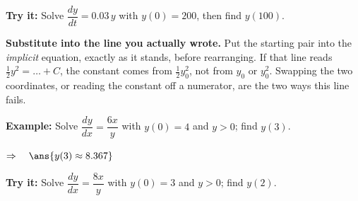 \documentclass[12pt]{article}
\begin{document}
\begin{tryitbox}
\textbf{Try it:} \quad Solve $\dfrac{dy}{dt} = 0.03\,y$ with $y(0) = 200$, then find $y(100)$.\\[2pt]
\end{tryitbox}


\begin{formulabox}
\textbf{Substitute into the line you actually wrote.} Put the starting pair into the \emph{implicit} equation, exactly as it stands, before rearranging. If that line reads $\tfrac{1}{2}y^2 = \ldots + C$, the constant comes from $\tfrac{1}{2}y_0^2$, not from $y_0$ or $y_0^2$. Swapping the two coordinates, or reading the constant off a numerator, are the two ways this line fails.
\end{formulabox}

\begin{examplebox}
\textbf{Example:} \quad Solve $\dfrac{dy}{dx} = \dfrac{6x}{y}$ with $y(0) = 4$ and $y > 0$; find $y(3)$.

$\Rightarrow\quad \ans{y(3) \approx 8.367}$
\end{examplebox}

\begin{tryitbox}
\textbf{Try it:} \quad Solve $\dfrac{dy}{dx} = \dfrac{8x}{y}$ with $y(0) = 3$ and $y > 0$; find $y(2)$.\\[2pt]
\end{tryitbox}
\end{document}
